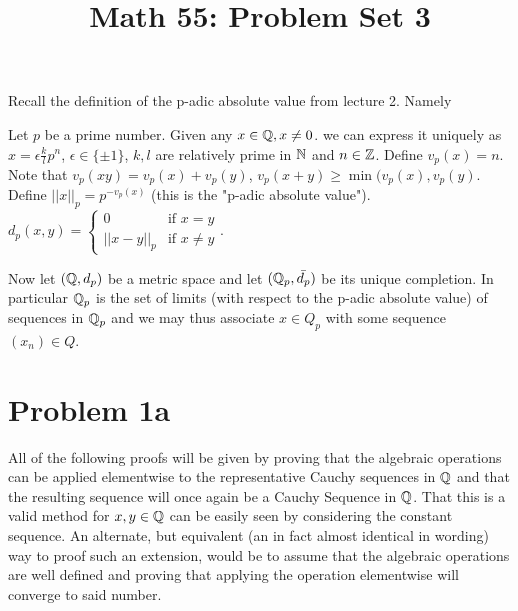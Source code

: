 \title{Math 55: Problem Set 3}

\maketitle
Recall the definition of the p-adic absolute value from lecture 2. Namely
\begin{mydef}
 Let $p$ be a prime number. Given any $x\in\mathbb{Q},x\neq0$. we can express it uniquely as $x=\epsilon \frac{k}{l} p^n$, $\epsilon\in\{\pm 1\}$, $k,l$ are relatively prime in $\mathbb{N}$ and $n\in\mathbb{Z}$. Define $v_p(x)=n$. Note that $v_p(xy)=v_p(x)+v_p(y)$, $v_p(x+y)\geq \min(v_p(x),v_p(y)$. Define $||x||_p=p^{-v_p(x)}$ (this is the "p-adic absolute value"). $d_p(x,y)=\begin{cases} 0 &\mbox{if } x=y \\ ||x-y||_p & \mbox{if }  x\neq y \end{cases}$. 
\end{mydef}
Now let $(\mathbb{Q},d_p)$ be a metric space and let $(\mathbb{Q}_p,\bar{d_p})$ be its unique completion. In particular $\mathbb{Q}_p$ is the set of limits (with respect to the p-adic absolute value) of sequences in $\mathbb{Q}_p$ and we may thus associate $x\in Q_p$ with some sequence $(x_n) \in Q$.

\section*{Problem 1a}
 All of the following proofs will be given by proving that the algebraic operations can be applied elementwise to the representative Cauchy sequences in $\mathbb{Q}$ and that the resulting sequence will once again be a Cauchy Sequence in $\mathbb{Q}$. That this is a valid method for $x,y\in \mathbb{Q}$ can be easily seen by considering the constant sequence. An alternate, but equivalent (an in fact almost identical in wording) way to proof such an extension, would be to assume that the algebraic operations are well defined and proving that applying the operation elementwise  will converge to said number. 

